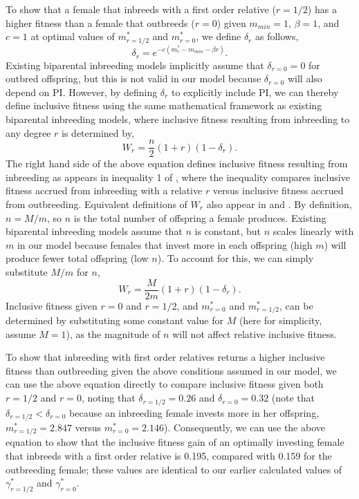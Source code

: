 \documentclass[12pt]{article}
\begin{document}
To show that a female that inbreeds with a first order relative ($r=1/2$) has a higher fitness than a female that outbreeds ($r=0$) given $m_{min}=1$, $\beta=1$, and $c=1$ at optimal values of $m^{*}_{r=1/2}$ and $m^{*}_{r=0}$, we define $\delta_{r}$ as follows,
\begin{equation}
\delta_{r} = e^{-c(m^{*}_{r}-m_{min}-\beta r)}.
\end{equation}
Existing biparental inbreeding models \cite[e.g.,][]{Kokko2006, Parker2006, Duthie2015a} implicitly assume that $\delta_{r=0}=0$ for outbred offspring, but this is not valid in our model because $\delta_{r=0}$ will also depend on PI. However, by defining $\delta_{r}$ to explicitly include PI, we can thereby define inclusive fitness using the same mathematical framework as existing biparental inbreeding models, where inclusive fitness resulting from inbreeding to any degree $r$ is determined by,
\begin{equation}
W_{r} = \frac{n}{2}\left(1+r\right)\left(1-\delta_{r}\right).
\end{equation}
The right hand side of the above equation defines inclusive fitness resulting from inbreeding as appears in inequality 1 of \cite{Duthie2015a}, where the inequality compares inclusive fitness accrued from inbreeding with a relative $r$ versus inclusive fitness accrued from outbreeding. Equivalent definitions of $W_{r}$ also appear in \cite{Parker2006} and \cite{Kokko2006}. By definition, $n = M/m$, so $n$ is the total number of offspring a female produces. Existing biparental inbreeding models assume that $n$ is constant, but $n$ scales linearly with $m$ in our model because females that invest more in each offspring (high $m$) will produce fewer total offspring (low $n$). To account for this, we can simply substitute $M/m$ for $n$,
\begin{equation}
W_{r} = \frac{M}{2 m}\left(1+r\right)\left(1-\delta_{r}\right).
\end{equation}
Inclusive fitness given $r=0$ and $r=1/2$, and $m^{*}_{r=0}$ and $m^{*}_{r=1/2}$, can be determined by substituting some constant value for $M$ (here for simplicity, assume $M=1$), as the magnitude of $n$ will not affect relative inclusive fitness. 

To show that inbreeding with first order relatives returns a higher inclusive fitness than outbreeding given the above conditions assumed in our model, we can use the above equation directly to compare inclusive fitness given both $r=1/2$ and $r=0$, noting that $\delta_{r=1/2}=0.26$ and $\delta_{r=0}=0.32$ (note that $\delta_{r=1/2}<\delta_{r=0}$ because an inbreeding female invests more in her offspring, $m^{*}_{r=1/2}=2.847$ versus $m^{*}_{r=0}=2.146$). Consequently, we can use the above equation to show that the inclusive fitness gain of an optimally investing female that inbreeds with a first order relative is 0.195, compared with 0.159 for the outbreeding female; these values are identical to our earlier calculated values of $\gamma^{*}_{r=1/2}$ and $\gamma^{*}_{r=0}$.
\end{document}
